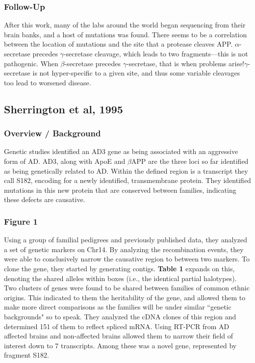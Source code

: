\subsubsection*{Follow-Up}

After this work, many of the labs around the world began sequencing from their brain banks, and a host of mutations was found. There seems to be a correlation between the location of mutations and the site that a protease cleaves APP. $\alpha$-secretase precedes $\gamma$-secretase cleavage, which leads to two fragments---this is not pathogenic. When $\beta$-secretase precedes $\gamma$-secretase, that is when problems arise!$ \gamma$-secretase is not hyper-specific to a given site, and thus some variable cleavages too lead to worsened disease. 


\subsection*{Sherrington et al, 1995}

\subsubsection*{Overview / Background}



Genetic studies identified an AD3 gene as being associated with an aggressive form of AD. AD3, along with ApoE and $\beta$APP are the three loci so far identified as being genetically related to AD. Within the defined region is a transcript they call S182, encoding for a newly identified, transmembrane protein. They identified mutations in this new protein that are conserved between families, indicating these defects are causative. 

\subsubsection*{Figure 1} Using a group of familial pedigrees and previously published data, they analyzed a set of genetic markers on Chr14. By analyzing the recombination events, they were able to conclusively narrow the causative region to between two markers. To clone the gene, they started by generating contigs. \textbf{Table 1} expands on this, denoting the shared alleles within boxes (i.e., the identical partial halotypes). Two clusters of genes were found to be shared between families of common ethnic origins. This indicated to them the heritability of the gene, and allowed them to make more direct comparisons as the families will be under similar ``genetic backgrounds" so to speak. They analyzed the cDNA clones of this region and determined 151 of them to reflect spliced mRNA. Using RT-PCR from AD affected brains and non-affected brains allowed them to narrow their field of interest down to 7 transcripts. Among these was a novel gene, represented by fragment S182. 


